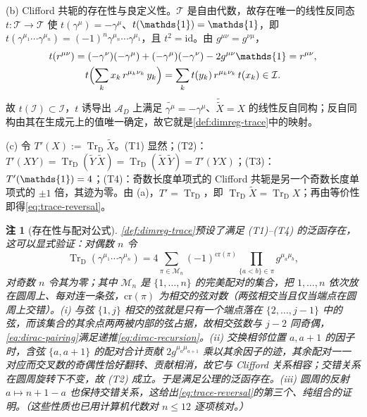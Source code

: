\documentclass[UTF8,a4paper,11pt,fontset=fandol]{ctexart}
\makeatletter
\let\amsmathbb\mathbb
\renewcommand{\mathbb}[1]{\ifx1#1\mathds{1}\else\amsmathbb{#1}\fi}
\theoremstyle{cplain}
\theoremstyle{cdefinition}
\theoremstyle{cremark}
\newtheorem{remark}[theorem]{注}
\renewcommand{\proofname}{证明}
\renewenvironment{proof}[1][\proofname]{\par\pushQED{\qed}\normalfont\topsep6\p@\@plus6\p@\relax
  \trivlist\item[\hskip\labelsep\itshape #1\hspace{0.5em}]\ignorespaces}{\popQED\endtrivlist\@endpefalse}
\numberwithin{equation}{section}
\newcommand{\TrD}{\operatorname{Tr}_{\mathrm{D}}}   %
\newcommand{\Cconj}[1]{\widetilde{#1}}              %
\makeatother
\begin{document}
\begin{proof}
(b) Clifford 共轭的存在性与良定义性。$\mathcal T$ 是自由代数，故存在唯一的线性反同态 $t:\mathcal T\to\mathcal T$ 使 $t(\gamma^\mu)=-\gamma^\mu$、$t(\mathbb 1)=\mathbb 1$，即 $t(\gamma^{\mu_1}\cdots\gamma^{\mu_n})=(-1)^n\gamma^{\mu_n}\cdots\gamma^{\mu_1}$，且 $t^2=\mathrm{id}$。由 $g^{\mu\nu}=g^{\nu\mu}$，
\begin{gather*}
t(r^{\mu\nu})=(-\gamma^\nu)(-\gamma^\mu)+(-\gamma^\mu)(-\gamma^\nu)-2g^{\mu\nu}\mathbb 1=r^{\mu\nu},\\
t\Bigl(\sum_kx_k\,r^{\mu_k\nu_k}\,y_k\Bigr)=\sum_kt(y_k)\,r^{\mu_k\nu_k}\,t(x_k)\in\mathcal I .
\end{gather*}
故 $t(\mathcal I)\subset\mathcal I$，$t$ 诱导出 $\mathcal A_D$ 上满足 $\Cconj{\gamma^\mu}=-\gamma^\mu$、$\Cconj{\Cconj X}=X$ 的线性反自同构；反自同构由其在生成元上的值唯一确定，故它就是\cref{def:dimreg-trace}中的映射。

(c) 令 $T'(X):=\TrD\Cconj X$。(T1) 显然；(T2)：$T'(XY)=\TrD(\Cconj Y\,\Cconj X)=\TrD(\Cconj X\,\Cconj Y)=T'(YX)$；(T3)：$T'(\mathbb 1)=4$；(T4)：奇数长度单项式的 Clifford 共轭是另一个奇数长度单项式的 $\pm1$ 倍，其迹为零。由 (a)，$T'=\TrD$，即 $\TrD\Cconj X=\TrD X$；再由等价性即得\cref{eq:trace-reversal}。
\end{proof}

\begin{remark}[存在性与配对公式]\label{rem:dirac-pairing}
\cref{def:dimreg-trace}预设了满足 (T1)--(T4) 的泛函存在，这可以显式验证：对偶数 $n$ 令
\begin{equation}\label{eq:dirac-pairing}
\TrD(\gamma^{\mu_1}\cdots\gamma^{\mu_n})=4\sum_{\pi\in\mathcal M_n}(-1)^{\mathrm{cr}(\pi)}\prod_{\{a<b\}\in\pi}g^{\mu_a\mu_b},
\end{equation}
对奇数 $n$ 令其为零；其中 $\mathcal M_n$ 是 $\{1,\dots,n\}$ 的完美配对的集合，把 $1,\dots,n$ 依次放在圆周上、每对连一条弦，$\mathrm{cr}(\pi)$ 为相交的弦对数（两弦相交当且仅当端点在圆周上交错）。(i) 与弦 $\{1,j\}$ 相交的弦就是只有一个端点落在 $\{2,\dots,j-1\}$ 中的弦，而该集合的其余点两两被内部的弦占据，故相交弦数与 $j-2$ 同奇偶，\cref{eq:dirac-pairing}满足递推\cref{eq:dirac-recursion}。(ii) 交换相邻位置 $a,a+1$ 的因子时，含弦 $\{a,a+1\}$ 的配对合计贡献 $2g^{\mu_a\mu_{a+1}}$ 乘以其余因子的迹，其余配对一一对应而交叉数的奇偶性恰好翻转、贡献相消，故它与 Clifford 关系相容；交错关系在圆周旋转下不变，故 (T2) 成立。于是满足公理的泛函存在。(iii) 圆周的反射 $a\mapsto n+1-a$ 也保持交错关系，这给出\cref{eq:trace-reversal}的第三个、纯组合的证明。（这些性质也已用计算机代数对 $n\le12$ 逐项核对。）
\end{remark}
\end{document}
